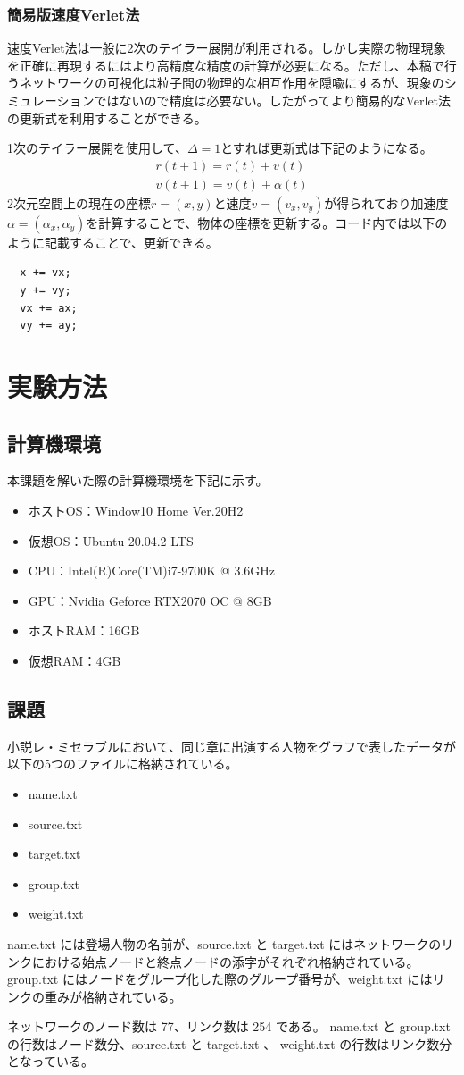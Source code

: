 \documentclass[dvipdfmx]{jsarticle}
\begin{document}
\subsubsection{簡易版速度Verlet法}
速度Verlet法は一般に2次のテイラー展開が利用される。しかし実際の物理現象を正確に再現するにはより高精度な精度の計算が必要になる。ただし、本稿で行うネットワークの可視化は粒子間の物理的な相互作用を隠喩にするが、現象のシミュレーションではないので精度は必要ない。したがってより簡易的なVerlet法の更新式を利用することができる。\par
1次のテイラー展開を使用して、$\Delta = 1$とすれば更新式は下記のようになる。
\begin{gather*}
  r(t + 1) = r(t) + v(t)\\
  v(t + 1) = v(t) + \alpha(t)
\end{gather*}
2次元空間上の現在の座標$r = (x, y)$と速度$v = (v_{x}, v_{y})$が得られており加速度$\alpha =(\alpha_{x}, \alpha_{y})$を計算することで、物体の座標を更新する。コード内では以下のように記載することで、更新できる。
\begin{verbatim}
  x += vx;
  y += vy;
  vx += ax;
  vy += ay;
\end{verbatim}
\section{実験方法}
\subsection{計算機環境}
本課題を解いた際の計算機環境を下記に示す。
\begin{itemize}
  \item ホストOS：Window10 Home Ver.20H2
  \item 仮想OS：Ubuntu 20.04.2 LTS
  \item CPU：Intel(R)Core(TM)i7-9700K @ 3.6GHz
  \item GPU：Nvidia Geforce RTX2070 OC @ 8GB
  \item ホストRAM：16GB
  \item 仮想RAM：4GB
\end{itemize}
\subsection{課題}
小説レ・ミセラブルにおいて、同じ章に出演する人物をグラフで表したデータが以下の5つのファイルに格納されている。
\begin{itemize}
  \item name.txt
  \item source.txt
  \item target.txt
  \item group.txt
  \item weight.txt
\end{itemize}
name.txt には登場人物の名前が、source.txt と target.txt にはネットワークのリンクにおける始点ノードと終点ノードの添字がそれぞれ格納されている。 group.txt にはノードをグループ化した際のグループ番号が、weight.txt にはリンクの重みが格納されている。\par
ネットワークのノード数は 77、リンク数は 254 である。 name.txt と group.txt の行数はノード数分、source.txt と target.txt 、 weight.txt の行数はリンク数分となっている。
\end{document}
